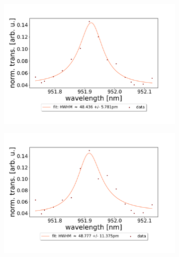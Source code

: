 \begin{figure}[h!]
\begin{subfigure}[b]{0.49\textwidth}
        \includegraphics[width=\textwidth]{figures/results/double fano fits/20250326/21um_M3:M5_fit_3.pdf}
        \caption{}
        \label{fig:21um_M3:M5_fit_3}
    \end{subfigure}
    \begin{subfigure}[b]{0.49\textwidth}
        \includegraphics[width=\textwidth]{figures/results/double fano fits/20250326/21um_M3:M5_fit_4.pdf}
        \caption{}
        \label{fig:21um_M3:M5_fit_4}
    \end{subfigure}
    \begin{subfigure}[b]{0.49\textwidth}

\end{subfigure}
\end{figure}

